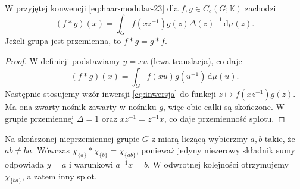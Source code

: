 \begin{wniosek}
\label{it:cor:haar-convolution-change}
W przyjętej konwencji \eqref{eq:haar-modular-23}
dla $f,g\in C_c(G;\mathbb K)$ zachodzi
\[
 (f*g)(x)=\int_G f(xz^{-1})g(z)\Delta(z)^{-1}
                  \,\mathrm d\mu(z).
\]
Jeżeli grupa jest przemienna, to $f*g=g*f$.
\end{wniosek}
\begin{proof}
W definicji podstawiamy $y=xu$ (lewa translacja),
co daje
\[
 (f*g)(x)=\int_G f(xu)g(u^{-1})\,\mathrm d\mu(u).
\]
Następnie stosujemy wzór inwersji \eqref{eq:inwersja}
do funkcji $z\mapsto f(xz^{-1})g(z)$. Ma ona zwarty nośnik
zawarty w nośniku $g$, więc obie całki są skończone.
W grupie przemiennej $\Delta=1$ oraz
$xz^{-1}=z^{-1}x$, co daje przemienność splotu.
\end{proof}

\begin{przyklad}
Na skończonej nieprzemiennej grupie $G$ z miarą
liczącą wybierzmy $a,b$ takie, że $ab\ne ba$.
Wówczas $\chi_{\{a\}}*\chi_{\{b\}}=\chi_{\{ab\}}$,
ponieważ jedyny niezerowy składnik sumy odpowiada
$y=a$ i warunkowi $a^{-1}x=b$.
W odwrotnej kolejności otrzymujemy
$\chi_{\{ba\}}$, a zatem inny splot.
\end{przyklad}

